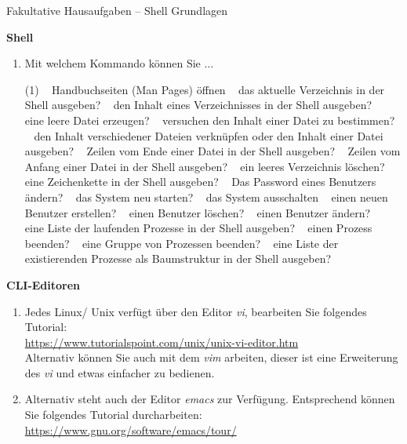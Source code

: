 \documentclass[paper=a4,fontsize=11pt]{scrartcl}%
\numberwithin{equation}{section}
\begin{document}
\center
\Large{Fakultative Hausaufgaben -- Shell Grundlagen}
\begin{center}\Large{\textbf{Shell}}\end{center}\vskip0.25in
\begin{enumerate}
	\item Mit welchem Kommando können Sie ...
   \begin{tasks}(1)
   \task~ Handbuchseiten (\glqq Man Pages\grqq) öffnen
   \task~ das aktuelle Verzeichnis in der Shell ausgeben?
   \task~ den Inhalt eines Verzeichnisses in der Shell ausgeben?
   \task~ eine leere Datei erzeugen?
   \task~ versuchen den Inhalt einer Datei zu bestimmen?
   \task~ den Inhalt verschiedener Dateien verknüpfen oder den Inhalt einer Datei ausgeben?
   \task~ Zeilen vom Ende einer Datei in der Shell ausgeben?
   \task~ Zeilen vom Anfang einer Datei in der Shell ausgeben?
   \task~ ein leeres Verzeichnis löschen?
   \task~ eine Zeichenkette in der Shell ausgeben?
   \task~ Das Password eines Benutzers ändern?
   \task~ das System neu starten?
   \task~ das System ausschalten
   \task~ einen neuen Benutzer erstellen?
   \task~ einen Benutzer löschen?
   \task~ einen Benutzer ändern?
   \task~ eine Liste der laufenden Prozesse in der Shell ausgeben?
   \task~ einen Prozess beenden?
   \task~ eine Gruppe von Prozessen beenden?
   \task~ eine Liste der existierenden Prozesse als Baumstruktur in der Shell ausgeben?
   \end{tasks}
      \end{enumerate}
   \begin{center}\Large{\textbf{CLI-Editoren}}\end{center}\vskip0.25in
   \begin{enumerate}
   		\item Jedes Linux/ Unix verfügt über den Editor \emph{vi}, bearbeiten Sie folgendes Tutorial:\\
  \url{https://www.tutorialspoint.com/unix/unix-vi-editor.htm}\\
  Alternativ können Sie auch mit dem \emph{vim} arbeiten, dieser ist eine Erweiterung des \emph{vi} und etwas einfacher zu bedienen.
  		\item Alternativ steht auch der Editor \emph{emacs} zur Verfügung. Entsprechend können Sie folgendes Tutorial durcharbeiten:\\
  		\url{https://www.gnu.org/software/emacs/tour/}
\end{enumerate}
\end{document}
